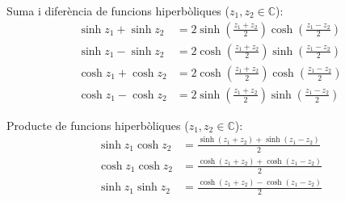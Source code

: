 Suma i diferència de funcions hiperbòliques ($z_1,
z_2\in\mathbb{C}$):
\begin{subequations}
\begin{align}
    \sinh z_1+\sinh z_2 &= 2 \sinh\left(\frac{z_1+z_2}{2}\right)
    \cosh\left(\frac{z_1-z_2}{2}\right)\\[1ex]
    \sinh z_1-\sinh z_2 &= 2 \cosh\left(\frac{z_1+z_2}{2}\right)
    \sinh\left(\frac{z_1-z_2}{2}\right)\\[1ex]
    \cosh z_1+\cosh z_2 &= 2 \cosh\left(\frac{z_1+z_2}{2}\right)
    \cosh\left(\frac{z_1-z_2}{2}\right)\\[1ex]
    \cosh z_1-\cosh z_2 &= 2 \sinh\left(\frac{z_1+z_2}{2}\right)
    \sinh\left(\frac{z_1-z_2}{2}\right)
\end{align}
\end{subequations}

Producte de funcions hiperbòliques ($z_1, z_2\in\mathbb{C}$):
\begin{subequations}
\begin{align}
    \sinh z_1 \cosh z_2 &=
    \frac{\sinh(z_1+z_2)+\sinh(z_1-z_2)}{2}\\[1ex]
    \cosh z_1 \cosh z_2 &=
    \frac{\cosh(z_1+z_2)+\cosh(z_1-z_2)}{2}\\[1ex]
    \sinh z_1 \sinh z_2 &=
    \frac{\cosh(z_1+z_2)-\cosh(z_1-z_2)}{2}
\end{align}
\end{subequations}
